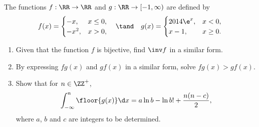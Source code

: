 \begin{problem}
    The functions $f : \RR \to \RR$ and $g : \RR \to [-1, \infty)$ are defined by \[f(x) = \begin{cases}-x , & x \leq 0,\\-x^2, & x> 0,\end{cases} \quad \tand \quad g(x) = \begin{cases}2014 \e^x, & x < 0, \\ x-1, & x \geq 0.\end{cases}\]

    \begin{enumerate}
        \item Given that the function $f$ is bijective, find $\inv f$ in a similar form.
        \item By expressing $fg(x)$ and $gf(x)$ in a similar form, solve $fg(x) > gf(x)$.
        \item Show that for $n \in \ZZ^+$, \[\int_{-\infty}^n \floor{g(x)} \d x = a \ln b - \ln{b!} + \frac{n(n-c)}{2},\] where $a$, $b$ and $c$ are integers to be determined.
    \end{enumerate}
\end{problem}
